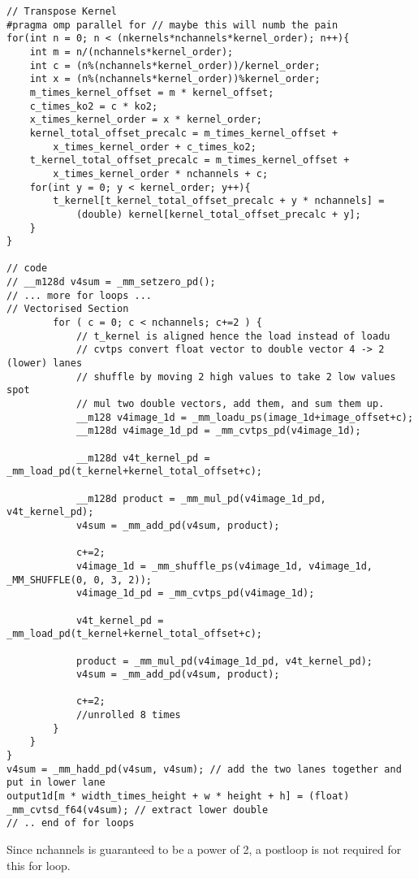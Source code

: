 \documentclass[12pt,fleqn,leqno,letterpaper]{article}
\begin{document}
\begin{verbatim}
// Transpose Kernel
#pragma omp parallel for // maybe this will numb the pain
for(int n = 0; n < (nkernels*nchannels*kernel_order); n++){
    int m = n/(nchannels*kernel_order);
    int c = (n%(nchannels*kernel_order))/kernel_order; 
    int x = (n%(nchannels*kernel_order))%kernel_order; 
    m_times_kernel_offset = m * kernel_offset;
    c_times_ko2 = c * ko2;
    x_times_kernel_order = x * kernel_order;
    kernel_total_offset_precalc = m_times_kernel_offset + 
        x_times_kernel_order + c_times_ko2;
    t_kernel_total_offset_precalc = m_times_kernel_offset + 
        x_times_kernel_order * nchannels + c;
    for(int y = 0; y < kernel_order; y++){
        t_kernel[t_kernel_total_offset_precalc + y * nchannels] = 
            (double) kernel[kernel_total_offset_precalc + y];
    }
}

// code
// __m128d v4sum = _mm_setzero_pd();
// ... more for loops ...
// Vectorised Section
        for ( c = 0; c < nchannels; c+=2 ) {
            // t_kernel is aligned hence the load instead of loadu
            // cvtps convert float vector to double vector 4 -> 2 (lower) lanes
            // shuffle by moving 2 high values to take 2 low values spot
            // mul two double vectors, add them, and sum them up.
            __m128 v4image_1d = _mm_loadu_ps(image_1d+image_offset+c);
            __m128d v4image_1d_pd = _mm_cvtps_pd(v4image_1d);

            __m128d v4t_kernel_pd = _mm_load_pd(t_kernel+kernel_total_offset+c);

            __m128d product = _mm_mul_pd(v4image_1d_pd, v4t_kernel_pd);
            v4sum = _mm_add_pd(v4sum, product);

            c+=2;
            v4image_1d = _mm_shuffle_ps(v4image_1d, v4image_1d, _MM_SHUFFLE(0, 0, 3, 2));
            v4image_1d_pd = _mm_cvtps_pd(v4image_1d);

            v4t_kernel_pd = _mm_load_pd(t_kernel+kernel_total_offset+c);

            product = _mm_mul_pd(v4image_1d_pd, v4t_kernel_pd);
            v4sum = _mm_add_pd(v4sum, product);

            c+=2;
            //unrolled 8 times
        }
    }
}
v4sum = _mm_hadd_pd(v4sum, v4sum); // add the two lanes together and put in lower lane
output1d[m * width_times_height + w * height + h] = (float) _mm_cvtsd_f64(v4sum); // extract lower double 
// .. end of for loops
\end{verbatim}
Since nchannels is guaranteed to be a power of 2, a postloop is not required for this for loop.
\end{document}
